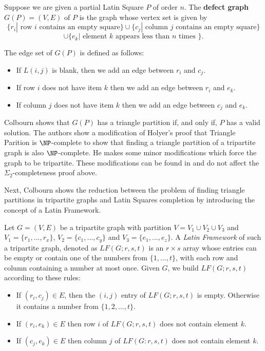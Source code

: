 \documentclass[runningheads,a4paper]{llncs}
\begin{document}
\begin{definition}
Suppose we are given a partial Latin Square $P$ of order $n$. The \textbf{defect graph $G(P) = (V,E)$} of $P$ is the graph whose vertex set is given by $$\{ r_i | \text{ row } i \text{ contains an empty square} \} \cup \{ c_j | \text{ column } j \text{ contains an empty square} \} $$
$$ \cup \{ e_k | \text{ element } k\text{ appears less than } n \text{ times } \} .$$ 

The edge set of $G(P)$ is defined as follows: 

\begin{itemize}
	\item If $L(i,j)$ is blank, then we add an edge between $r_i$ and $c_j$. 
	\item If row $i$ does not have item $k$ then we add an edge between $r_i$ and $e_k$. 
	\item If column $j$ does not have item $k$ then we add an edge between $c_j$ and $e_k$.
\end{itemize}
\end{definition}

Colbourn \cite{colbourn1984complexity} shows that $G(P)$ has a triangle partition if, and only if, $P$ has a valid solution. The authors show a modification of Holyer's proof that Triangle Parition is $\NP$-complete to show that finding a triangle partition of a tripartite graph is also $\NP$-complete. He makes some minor modifications which force the graph to be tripartite. These modifications can be found in \cite{colbourn1984complexity} and do not affect the $\Sigma_2$-completeness proof above. 

Next, Colbourn shows the reduction between the problem of finding triangle partitions in tripartite graphs and Latin Squares completion by introducing the concept of a Latin Framework. 

\begin{definition} 
Let $G = (V, E)$ be a tripartite graph with partition $V = V_1 \cup V_2 \cup V_3$ and $V_1 = \{r_1,...,r_x\}$, $V_2 = \{c_1,...,c_y\}$ and $V_3 = \{e_1,...,e_z\}$. A \emph{Latin Framework} of such a tripartite graph, denoted as $LF(G;r,s,t)$ is an $r \times s$ array whose entries can be empty or contain one of the numbers from $\{1, ... ,t \}$, with each row and column containing a number at most once. Given $G$, we build $LF(G;r,s,t)$ according to these rules: 

\begin{itemize}
	\item If $(r_i, c_j) \in E$, then the $(i,j)$ entry of $LF(G;r,s,t)$ is empty. Otherwise it contains a number from $\{1,2,...,t\}$. 
	\item If $(r_i, e_k) \in E$ then row $i$ of $LF(G;r,s,t)$ does not contain element $k$. 
	\item If $(c_j, e_k) \in E$ then column $j$ of $LF(G:r,s,t)$ does not contain element $k$. 
\end{itemize}
\end{definition}
\end{document}
